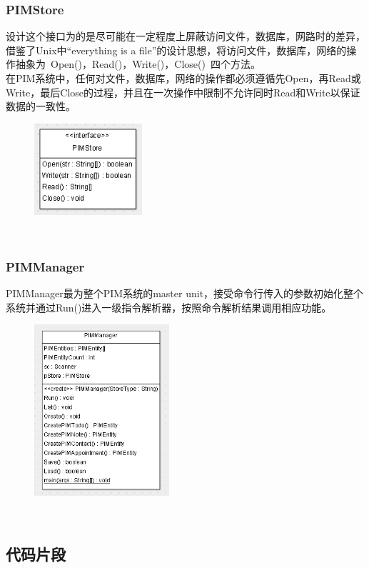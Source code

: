 \documentclass[a4paper]{article}
\begin{document}
    \subsubsection{PIMStore}
        设计这个接口为的是尽可能在一定程度上屏蔽访问文件，数据库，网路时的差异，借鉴了Unix中“everything is a file”的设计思想，将访问文件，数据库，网络的操作抽象为\ Open()，Read()，Write()，Close()\ 四个方法。\\
        在PIM系统中，任何对文件，数据库，网络的操作都必须遵循先Open，再Read或Write，最后Close的过程，并且在一次操作中限制不允许同时Read和Write以保证数据的一致性。
        \begin{figure}[h]
            \centering
            \includegraphics[width=4cm]{store.png}
        \end{figure}\\

    \subsubsection{PIMManager}
        PIMManager最为整个PIM系统的master unit，接受命令行传入的参数初始化整个系统并通过Run()进入一级指令解析器，按照命令解析结果调用相应功能。
        \begin{figure}[h]
            \centering
            \includegraphics[width=5cm]{mamager.png}
        \end{figure}\\
\subsection{代码片段}
\end{document}
